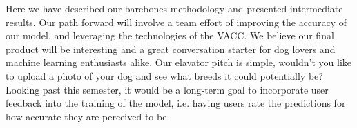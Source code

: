 \documentclass[12pt]{article}
\begin{document}
Here we have described our barebones methodology and presented intermediate results. Our path forward will involve a team effort of improving the accuracy of our model, and leveraging the technologies of the VACC. We believe our final product will be interesting and a great conversation starter for dog lovers and machine learning enthusiasts alike. Our elavator pitch is simple, wouldn't you like to upload a photo of your dog and see what breeds it could potentially be? Looking past this semester, it would be a long-term goal to incorporate user feedback into the training of the model, i.e. having users rate the predictions for how accurate they are perceived to be. 

\nocite{*}
{}

\end{document}
